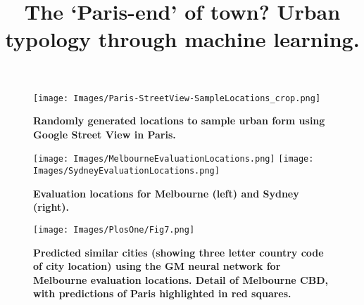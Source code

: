 \documentclass[Crown,sageh,times]{sagej}
\begin{document}
\title{The `Paris-end' of town? Urban typology through machine learning.}



\maketitle

\begin{figure}[!htbp] 
\centering    
\texttt{[image: Images/Paris-StreetView-SampleLocations\_crop.png]} 
\caption{\bf Randomly generated locations to sample urban form using Google Street View in Paris.} 
\label{fig:parissample}  
\end{figure}

\begin{figure}[!htbp]
\centering 
\texttt{[image: Images/MelbourneEvaluationLocations.png]}   
\texttt{[image: Images/SydneyEvaluationLocations.png]}    
\caption{\bf Evaluation locations for Melbourne (left) and Sydney (right).}    
 \label{fig:supp_melsydevallocations}  
\end{figure} 

\begin{figure}[!htbp]
\centering     
\texttt{[image: Images/PlosOne/Fig7.png]} 
\caption{\bf Predicted similar cities (showing three letter country code of city location) using the GM neural network for Melbourne evaluation locations. Detail of Melbourne CBD, with predictions of Paris highlighted in red squares.}    
 \label{fig:supp_melmapscbd}  
\end{figure} 
\end{document}
